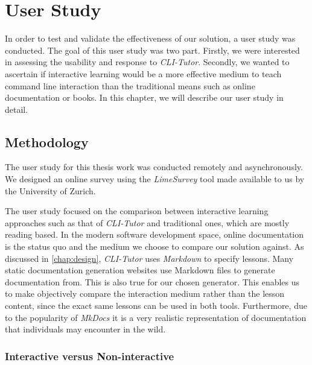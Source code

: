 \chapter{User Study}
\label{chap:userstudy}

In order to test and validate the effectiveness of our solution, a user study
was conducted. The goal of this user study was two part. Firstly, we were
interested in assessing the usability and response to \textit{CLI-Tutor}.
Secondly, we wanted to ascertain if interactive learning would be a more
effective medium to teach command line interaction than the traditional means
such as online documentation or books. In this chapter, we will describe our
user study in detail.


\section{Methodology}

The user study for this thesis work was conducted remotely and asynchronously.
We designed an online survey using the \textit{LimeSurvey}\cite{schmitzlime}
tool made available to us by the University of Zurich.

The user study focused on the comparison between interactive learning
approaches such as that of \textit{CLI-Tutor} and traditional ones, which are
mostly reading based. In the modern software development space, online
documentation is the status quo and the medium we choose to compare our
solution against. As discussed in \autoref{chap:design}, \textit{CLI-Tutor}
uses \textit{Markdown} to specify lessons. Many static documentation generation
websites use Markdown files to generate documentation from. This is also true
for our chosen generator. This enables us to make objectively compare the
interaction medium rather than the lesson content, since the exact same lessons
can be used in both tools. Furthermore, due to the popularity of
\textit{MkDocs} it is a very realistic representation of documentation that
individuals may encounter in the wild.


\subsection{Interactive versus Non-interactive}





